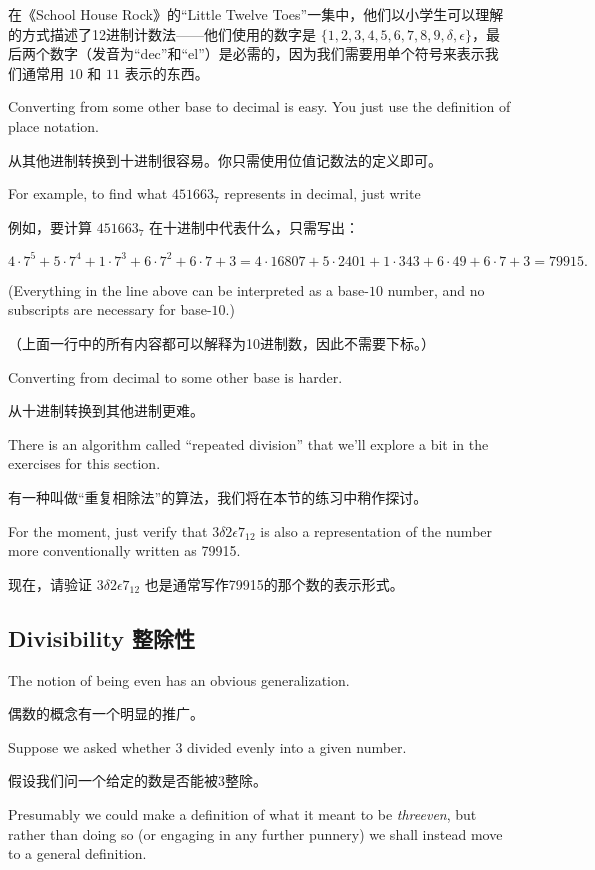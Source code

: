 在《School House Rock》的“Little Twelve Toes”一集中，他们以小学生可以理解的方式描述了12进制计数法——他们使用的数字是 $\{1, 2, 3, 4, 5, 6, 7, 8, 9, \delta, \epsilon \}$，最后两个数字（发音为“dec”和“el”）是必需的，因为我们需要用单个符号来表示我们通常用 $10$ 和 $11$ 表示的东西。

Converting from some other base to decimal is easy.  You just use the 
definition of place notation.

从其他进制转换到十进制很容易。你只需使用位值记数法的定义即可。

For example, to find what $451663_7$ 
represents in decimal, just write

例如，要计算 $451663_7$ 在十进制中代表什么，只需写出：

\[ 4 \cdot 7^5 + 5 \cdot 7^4 + 1 \cdot 7^3 + 6 \cdot 7^2 + 6 \cdot 7 + 3 =  4 \cdot 16807 + 5 \cdot 2401 + 1 \cdot 343 + 6 \cdot 49 + 6 \cdot 7 + 3 = 79915. \] 

(Everything in the line above can be interpreted as a base-$10$ number, 
and no subscripts are necessary for base-$10$.)

（上面一行中的所有内容都可以解释为10进制数，因此不需要下标。）

Converting from decimal to some other base is harder.

从十进制转换到其他进制更难。

There is an algorithm 
called ``repeated division'' that we'll explore a bit in the exercises 
for this section.

有一种叫做“重复相除法”的算法，我们将在本节的练习中稍作探讨。

For the moment, just verify that 
$3\delta 2\epsilon 7_{12}$ is also a representation of the
number more conventionally written as 79915.

现在，请验证 $3\delta 2\epsilon 7_{12}$ 也是通常写作79915的那个数的表示形式。

\subsection{Divisibility 整除性}
\label{div}

The notion of being even has an obvious generalization.

偶数的概念有一个明显的推广。

Suppose
we asked whether $3$ divided evenly into a given number.

假设我们问一个给定的数是否能被3整除。

Presumably
we could make a definition of what it meant to be {\em threeven}, but
rather than doing so (or engaging in any further punnery) we shall
instead move to a general definition.

